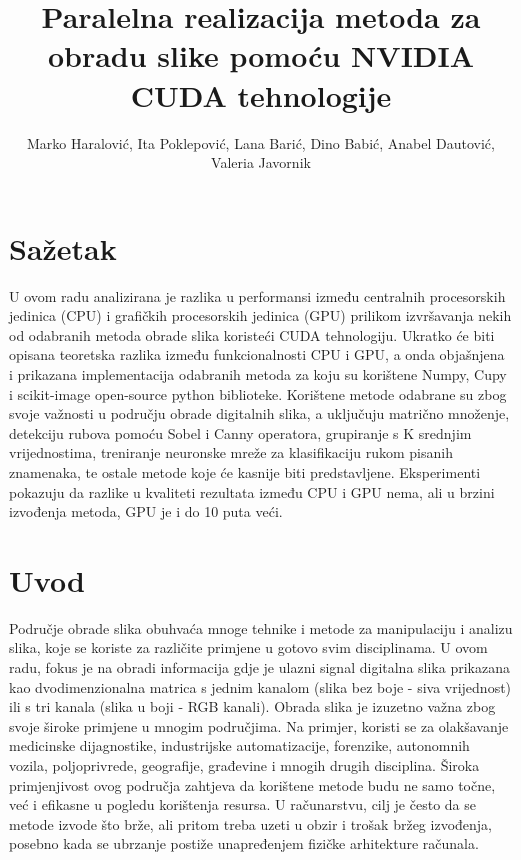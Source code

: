 \documentclass[a4paper,twocolumn]{article}
\begin{document}
	
	\title{Paralelna realizacija metoda za obradu slike pomoću NVIDIA CUDA tehnologije} 
	\author{Marko Haralović, Ita Poklepović, Lana Barić, Dino Babić,  Anabel Dautović, Valeria Javornik}
	\maketitle

	
	\section*{Sažetak}
	U ovom radu analizirana je razlika u performansi između centralnih procesorskih jedinica (CPU) i grafičkih procesorskih jedinica (GPU) prilikom izvršavanja nekih od odabranih metoda obrade slika koristeći CUDA tehnologiju.  Ukratko će biti opisana teoretska razlika između funkcionalnosti CPU i GPU, a onda objašnjena i prikazana implementacija odabranih metoda za koju su korištene Numpy, Cupy i scikit-image open-source python biblioteke. Korištene metode odabrane su zbog svoje važnosti u području obrade digitalnih slika, a uključuju matrično množenje, detekciju rubova pomoću Sobel i Canny operatora, grupiranje s K srednjim vrijednostima, treniranje neuronske mreže za klasifikaciju rukom pisanih znamenaka, te ostale metode koje će kasnije biti predstavljene. Eksperimenti pokazuju da razlike u kvaliteti rezultata između CPU i GPU nema, ali u brzini izvođenja metoda, GPU je i do 10 puta veći.
 
	
	\section{Uvod}
	
    Područje obrade slika obuhvaća mnoge tehnike i metode za manipulaciju i analizu slika, koje se koriste za različite primjene u gotovo svim disciplinama. U ovom radu, fokus je na obradi informacija gdje je ulazni signal digitalna slika prikazana kao dvodimenzionalna matrica s jednim kanalom (slika bez boje - siva vrijednost) ili s tri kanala (slika u boji - RGB kanali). \newline
    Obrada slika je izuzetno važna zbog svoje široke primjene u mnogim područjima. Na primjer, koristi se za olakšavanje medicinske dijagnostike, industrijske automatizacije, forenzike, autonomnih vozila, poljoprivrede, geografije, građevine i mnogih drugih disciplina. Široka primjenjivost ovog područja zahtjeva da korištene metode budu ne samo točne, već i efikasne u pogledu korištenja resursa. U računarstvu, cilj je često da se metode izvode što brže, ali pritom treba uzeti u obzir i trošak bržeg izvođenja, posebno kada se ubrzanje postiže unapređenjem fizičke arhitekture računala.
    
\end{document}
